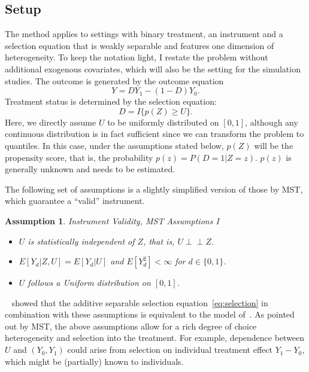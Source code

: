 \documentclass[12pt,a4paper,english]{article} %
\newcommand{\indep}{\perp\!\!\!\!\perp}
\numberwithin{equation}{section}
\theoremstyle{definition}
\theoremstyle{remark}
\theoremstyle{plain}
\newtheorem{assumption}{Assumption}
\begin{document}
\subsection{Setup}
The method applies to settings with binary treatment, an instrument and a selection equation that is weakly separable and features one dimension of heterogeneity.
To keep the notation light, I restate the problem without additional exogenous covariates, which will also be the setting for the simulation studies.
The outcome is generated by the outcome equation
\begin{equation}\label{eq:outcome}
  Y = DY_1 - (1-D) Y_0.
\end{equation}
Treatment status is determined by the selection equation:
\begin{equation}\label{eq:selection}
  D = I\{p(Z) \geq U\}.
\end{equation}
Here, we directly assume $U$ to be uniformly distributed on $[0,1]$, although any continuous distribution is in fact sufficient since we can transform the problem to quantiles.
In this case, under the assumptions stated below, $p(Z)$ will be the propensity score, that is, the probability $p(z) = P(D=1|Z=z)$.
$p(z)$ is generally unknown and needs to be estimated.

The following set of assumptions is a slightly simplified version of those by MST, which guarantee a ``valid'' instrument.

\begin{assumption}{Instrument Validity, MST Assumptions I}
\begin{itemize}
  \item[1.1] $U$ is statistically independent of $Z$, that is, $U \indep Z$.
  \item[1.2] $E[Y_d|Z,U] = E[Y_d|U]$ and $E[Y_d^2]<\infty$ for $d\in\{0,1\}$.
  \item[1.3] $U$ follows a Uniform distribution on $[0,1]$.
\end{itemize}
\end{assumption}
~\cite{vytlacil2002independence} showed that the additive separable selection equation~\ref{eq:selection} in combination with these assumptions is equivalent to the model of~\cite{imbens_angrist1994ecma}.
As pointed out by MST, the above assumptions allow for a rich degree of choice heterogeneity and selection into the treatment.
For example, dependence between $U$ and $(Y_0, Y_1)$ could arise from selection on individual treatment effect $Y_1-Y_0$, which might be (partially) known to individuals.
\end{document}
